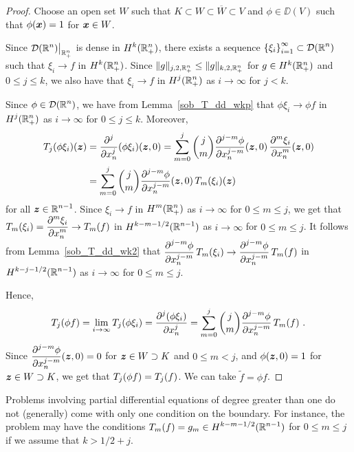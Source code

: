 \begin{proof}
Choose an open set $W$ such that $K \subset W \subset \overline{W} \subset V$
and $\phi \in \DD(V)$ such that $\phi(\VEC{x}) = 1$ for $\VEC{x} \in W$.

Since $\DS \DD(\RR^n)\big|_{\RR^n_+}$ is dense in
$\DS H^k(\RR^n_+)$, there exists a sequence
$\DS \left\{\xi_i\right\}_{i=1}^\infty \subset \DD(\RR^n)$
such that $\xi_i \to f$ in $\DS H^k(\RR^n_+)$.
Since $\|g\|_{j,2,\RR^n_+} \leq \|g\|_{k,2,\RR^n_+}$ for $g \in H^k(\RR^n_+)$
and $0 \leq j \leq k$, we also have that $\xi_i \to f$ in
$\DS H^j(\RR^n_+)$ as $i \to \infty$ for $j<k$.

Since $\DS \phi \in \DD(\RR^n)$, we have from
Lemma~\ref{sob_T_dd_wkp} that 
$\phi \xi_i \to \phi f$ in $\DS H^j(\RR^n_+)$ as $i \to \infty$
for $0 \leq j \leq k$.  Moreover,
\begin{align*}
T_j( \phi \xi_i)(\VEC{z}) &= \pdfdxn{(\phi \xi_i)}{x_n}{j}(\VEC{z},0)
= \sum_{m=0}^j \binom{j}{m} \pdydxn{\phi}{x_n}{j-m}(\VEC{z},0)\,
\pdydxn{\xi_i}{x_n}{m}(\VEC{z},0) \\
&= \sum_{m=0}^j \binom{j}{m} \pdydxn{\phi}{x_n}{j-m}(\VEC{z},0)\,
T_m(\xi_i)(\VEC{z})
\end{align*}
for all $\DS \VEC{z} \in \RR^{n-1}$.
Since $\xi_i \to f$ in $\DS H^m(\RR^n_+)$ as $i \to \infty$ for
$0 \leq m \leq j$, we get that
$\DS T_m(\xi_i) = \pdydxn{\xi_i}{x_n}{m} \to T_m(f)$
in $\DS H^{k-m-1/2}(\RR^{n-1})$
as $i \to \infty$ for $0 \leq m \leq j$.  It follows from
Lemma~\ref{sob_T_dd_wk2} that
$\DS \pdydxn{\phi}{x_n}{j-m}\, T_m(\xi_i) 
\to \pdydxn{\phi}{x_n}{j-m}\, T_m(f)$ in
$\DS H^{k-j-1/2}(\RR^{n-1})$ as $i \to \infty$ for
$0 \leq m \leq j$.

Hence,
\[
T_j(\phi f) = \lim_{i\to \infty} T_j( \phi \xi_i) = \pdydxn{(\phi \xi_i)}{x_n}{j}
= \sum_{m=0}^j \binom{j}{m} \pdydxn{\phi}{x_n}{j-m}\, T_m(f) \ .
\]
Since $\DS \pdydxn{\phi}{x_n}{j-m}(\VEC{z},0) = 0$
for $\VEC{z} \in W \supset K$ and $0 \leq m<j$, and
$\DS \phi(\VEC{z},0) = 1$ for $\VEC{z} \in W \supset K$, we
get that $\DS T_j(\phi f) = T_j(f)$.  We can take
$\tilde{f} = \phi f$.
\end{proof}

Problems involving partial differential equations of degree greater
than one do not (generally) come with only one condition on the
boundary.  For instance, the problem may have the conditions
$\DS T_m(f) = g_m \in H^{k-m-1/2}(\RR^{n-1})$ for
$0 \leq m \leq j$ if we assume that $k > 1/2 +j$.

